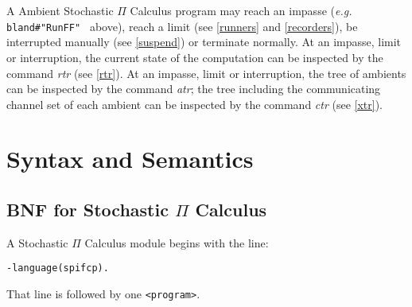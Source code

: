 A Ambient Stochastic $\Pi$ Calculus program may reach an impasse ({\em e.g.}
\verb+ bland#"RunFF" + above), reach a limit (see \ref{runners}
and \ref{recorders}), be interrupted manually (see \ref{suspend})
or terminate normally.  At an impasse, limit or interruption,
the current state of the computation can be inspected by the command
{\em rtr} (see \ref{rtr}).
At an impasse, limit or interruption, the tree of ambients can be inspected
by the command {\em atr}; the tree including the communicating channel
set of each ambient can be inspected by the command {\em ctr}
(see \ref{xtr}).

\appendix
\chapter{Syntax and Semantics}
\section{BNF for Stochastic $\Pi$ Calculus}
\label{SPIBNF}
A Stochastic $\Pi$ Calculus module begins with the line:

\begin{verbatim}
-language(spifcp).
\end{verbatim}

\noindent
That line is followed by one \verb+<program>+.

